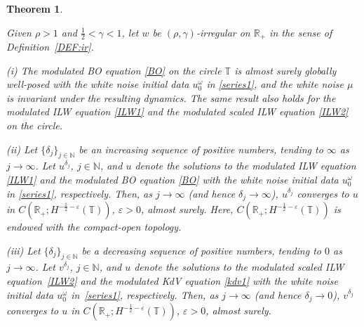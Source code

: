 \documentclass[letterpaper, 11pt,  reqno]{amsart}
\newtheorem{theorem}{Theorem} [section]
\newcommand{\1}{\hspace{0.5mm}\text{I}\hspace{0.5mm}}
\newcommand{\noi}{\noindent}
\newcommand{\R}{\mathbb{R}}
\newcommand{\T}{\mathbb{T}}
\newcommand{\dl}{\delta}
\newcommand{\eps}{\varepsilon}
\newcommand{\g}{\gamma}
\renewcommand{\o}{\omega}
\newcommand{\N}{\mathbb{N}}
\numberwithin{equation}{section}
\numberwithin{theorem}{section}
\begin{document}
\begin{theorem}\label{THM:white2}

Given $\rho > 1 $ and  $\frac12< \g < 1$, 
let  $w$ be $(\rho,\g)$-irregular on $\R_+$ in the sense of Definition~\ref{DEF:ir}.


\smallskip

\noi
\textup{(i)}
The modulated BO equation \eqref{BO}
on the circle $\T$
is almost surely globally well-posed
with the white noise initial data
$u_0^\o$ in \eqref{series1}, 
and the white noise $\mu$ is invariant under the resulting dynamics.
The same result also 
holds
for the modulated ILW equation \eqref{ILW1}
and the modulated scaled ILW equation \eqref{ILW2} on the circle.



\smallskip

\noi
\textup{(ii)}
Let $\{\dl_j \}_{j \in \N}$ be an increasing sequence of positive numbers, tending to $\infty$
as $j \to \infty$.
Let $u^{\dl_j}$, $j \in \N$,  and $u$ denote the  solutions
to the modulated ILW equation \eqref{ILW1}
and the modulated BO equation \eqref{BO}
with the white noise initial data
$u_0^\o$ in \eqref{series1}, respectively.
Then, as $j \to \infty$ \textup{(}and hence $\dl_j \to \infty$\textup{)}, 
$u^{\dl_j}$ converges  to $u$ in 
$C(\R_+; H^{- \frac 12 - \eps}(\T))$, $\eps > 0$, 
almost surely.
Here, 
$C(\R_+; H^{- \frac 12 - \eps}(\T))$
is endowed with the compact-open topology.


\smallskip

\noi
\textup{(iii)}
Let $\{\dl_j \}_{j \in \N}$ be a decreasing sequence of positive numbers, tending to $0$
as $j \to \infty$.
Let $v^{\dl_j}$, $j \in \N$,  and $u$ denote the  solutions
to the modulated scaled ILW equation~\eqref{ILW2}
and the modulated KdV equation \eqref{kdv1}
with the white noise initial data 
$u_0^\o$ in~\eqref{series1}, respectively.
Then, as $j \to \infty$ \textup{(}and hence $\dl_j \to 0$\textup{)}, 
$v^{\dl_j}$ converges  to $u$ in 
$C(\R_+; H^{-\frac 12 - \eps}(\T))$, $\eps > 0$, 
almost surely.




\end{theorem}
\end{document}
